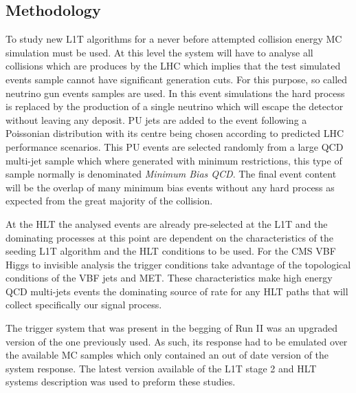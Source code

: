 \subsection{Methodology}
\label{SECTION:RunIITriggerStudies_Methodology}


To study new \gls{L1T} algorithms for a never before attempted collision energy \gls{MC} simulation must be used. At this level the system will have to analyse all collisions which are produces by the \gls{LHC} which implies that the test simulated events sample cannot have significant generation cuts. For this purpose, so called neutrino gun events samples are used. In this event simulations the hard process is replaced by the production of a single neutrino which will escape the detector without leaving any deposit. \acrfull{PU} jets are added to the event following a Poissonian distribution with its centre being chosen according to predicted \gls{LHC} performance scenarios. This \gls{PU} events are selected randomly from a large \gls{QCD} multi-jet sample which where generated with minimum restrictions, this type of sample normally is denominated \textit{Minimum Bias \gls{QCD}}. The final event content will be the overlap of many minimum bias events without any hard process as expected from the great majority of the collision.

At the \gls{HLT} the analysed events are already pre-selected at the \gls{L1T} and the dominating processes at this point are dependent on the characteristics of the seeding \gls{L1T} algorithm and the \gls{HLT} conditions to be used. For the \gls{CMS} \gls{VBF} Higgs to invisible analysis the trigger conditions take advantage of the topological conditions of the \gls{VBF} jets and \gls{MET}. These characteristics make high energy \gls{QCD} multi-jets events the dominating source of rate for any \gls{HLT} paths that will collect specifically our signal process.

The trigger system that was present in the begging of Run II was an upgraded version of the one previously used. As such, its response had to be emulated over the available \gls{MC} samples which only contained an out of date version of the system response. The latest version available of the \gls{L1T} stage 2 and \gls{HLT} systems description was used to preform these studies.

